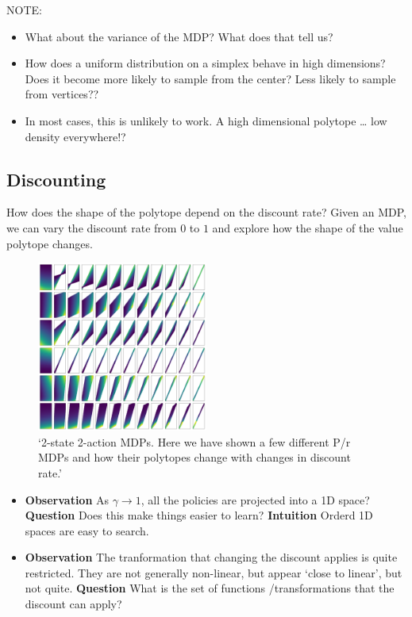 NOTE:

\begin{itemize}
\item
  What about the variance of the MDP? What does that tell us?
\item
  How does a uniform distribution on a simplex behave in high
  dimensions? Does it become more likely to sample from the center? Less
  likely to sample from vertices??
\item
  In most cases, this is unlikely to work. A high dimensional polytope
  \ldots{} low density everywhere!?
\end{itemize}


\subsection{Discounting}

How does the shape of the polytope depend on the discount rate? Given an
MDP, we can vary the discount rate from \(0\) to \(1\) and explore how
the shape of the value polytope changes.

\begin{figure}
\centering
\includegraphics[width=0.5\textwidth,height=0.5\textheight]{../../pictures/figures/discounts.png}
\caption{`2-state 2-action MDPs. Here we have shown a few different P/r
MDPs and how their polytopes change with changes in discount rate.'}
\end{figure}

\begin{itemize}
\item
  \textbf{Observation} As \(\gamma \to 1\), all the policies are
  projected into a 1D space? \textbf{Question} Does this make things
  easier to learn? \textbf{Intuition} Orderd 1D spaces are easy to
  search.
\item
  \textbf{Observation} The tranformation that changing the discount
  applies is quite restricted. They are not generally non-linear, but
  appear `close to linear', but not quite. \textbf{Question} What is the
  set of functions /transformations that the discount can apply?
\end{itemize}


